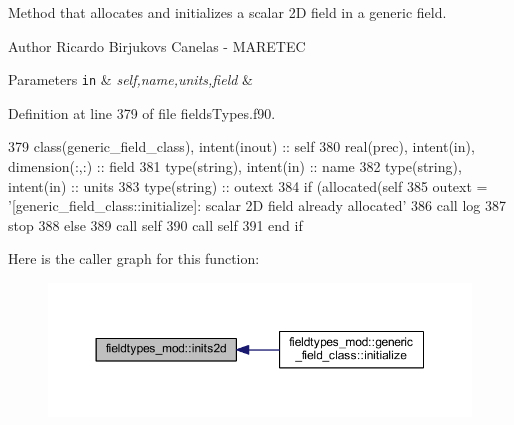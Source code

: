 Method that allocates and initializes a scalar 2D field in a generic field. 

\begin{DoxyAuthor}{Author}
Ricardo Birjukovs Canelas -\/ M\+A\+R\+E\+T\+EC 
\end{DoxyAuthor}

\begin{DoxyParams}[1]{Parameters}
\mbox{\tt in}  & {\em self,name,units,field} & \\
\hline
\end{DoxyParams}


Definition at line 379 of file fields\+Types.\+f90.


\begin{DoxyCode}
379     \textcolor{keywordtype}{class}(generic\_field\_class), \textcolor{keywordtype}{intent(inout)} :: self
380     \textcolor{keywordtype}{real(prec)}, \textcolor{keywordtype}{intent(in)}, \textcolor{keywordtype}{dimension(:,:)} :: field
381     \textcolor{keywordtype}{type}(string), \textcolor{keywordtype}{intent(in)} :: name
382     \textcolor{keywordtype}{type}(string), \textcolor{keywordtype}{intent(in)} :: units
383     \textcolor{keywordtype}{type}(string) :: outext
384     \textcolor{keywordflow}{if} (\textcolor{keyword}{allocated}(self%
385         outext = \textcolor{stringliteral}{'[generic\_field\_class::initialize]: scalar 2D field already allocated'}
386         \textcolor{keyword}{call }log%
387         stop
388     \textcolor{keywordflow}{else}
389         \textcolor{keyword}{call }self%
390         \textcolor{keyword}{call }self%
391 \textcolor{keywordflow}{    end if}
\end{DoxyCode}
Here is the caller graph for this function\+:\nopagebreak
\begin{figure}[H]
\begin{center}
\leavevmode
\includegraphics[width=350pt]{namespacefieldtypes__mod_ad3329e97ec60bf9226d19be45ed21859_icgraph}
\end{center}
\end{figure}
\mbox{\label{namespacefieldtypes__mod_a750ce2c729d98ea7031c839a3a5ebd7c}} 
